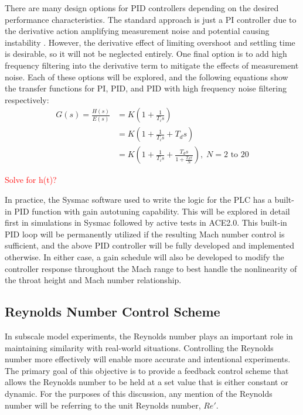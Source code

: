 There are many design options for PID controllers depending on the desired performance characteristics. The standard approach is just a PI controller due to the derivative action amplifying measurement noise and potential causing instability \cite{fung}. However, the derivative effect of limiting overshoot and settling time is desirable, so it will not be neglected entirely. One final option is to add high frequency filtering into the derivative term to mitigate the effects of measurement noise. Each of these options will be explored, and the following equations show the transfer functions for PI, PID, and PID with high frequency noise filtering respectively:
\begin{subequations}
    \begin{align}
        G(s) = \frac{H(s)}{E(s)} &= K \left(1 + \frac{1}{T_i s}\right) \label{eq:M-PI}\\
                                 &= K \left(1 + \frac{1}{T_i s} + T_d s\right) \label{eq:M-PID}\\
                                 &= K \left(1 + \frac{1}{T_i s} + \frac{T_d s}{1+\frac{T_d s}{N}}\right), \; N=2\textrm{ to }20 \label{eq:M-PID-filter}
    \end{align}
\end{subequations}

\textcolor{red}{Solve for h(t)?}

In practice, the Sysmac software used to write the logic for the PLC has a built-in PID function with gain autotuning capability. This will be explored in detail first in simulations in Sysmac followed by active tests in ACE2.0. This built-in PID loop will be permanently utilized if the resulting Mach number control is sufficient, and the above PID controller will be fully developed and implemented otherwise. In either case, a gain schedule will also be developed to modify the controller response throughout the Mach range to best handle the nonlinearity of the throat height and Mach number relationship.

\subsection{Reynolds Number Control Scheme}

In subscale model experiments, the Reynolds number plays an important role in maintaining similarity with real-world situations. Controlling the Reynolds number more effectively will enable more accurate and intentional experiments. The primary goal of this objective is to provide a feedback control scheme that allows the Reynolds number to be held at a set value that is either constant or dynamic. For the purposes of this discussion, any mention of the Reynolds number will be referring to the unit Reynolds number, $Re'$.

